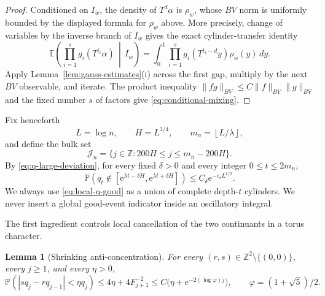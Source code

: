 \documentclass[11pt,a4paper]{amsart}
\newtheorem{lemma}[theorem]{Lemma}
\theoremstyle{definition}
\theoremstyle{remark}
\newcommand{\Z}{\mathbb Z}
\newcommand{\E}{\mathbb E}
\newcommand{\Pp}{\mathbb P}
\newcommand{\e}{\mathrm e}
\begin{document}
\begin{proof}
Conditioned on $I_w$, the density of $T^d\alpha$ is $\rho_w$, whose $BV$
norm is uniformly bounded by the displayed formula for $\rho_w$ above.  More
precisely, change of variables by the inverse branch of $I_w$ gives the exact
cylinder-transfer identity
\[
 \E\left(\prod_{i=1}^s g_i(T^{t_i}\alpha)\,\middle|\,I_w\right)
 =\int_0^1\prod_{i=1}^s g_i(T^{t_i-d}y)\rho_w(y)\,dy.
\]
Apply Lemma~\ref{lem:gauss-estimates}(i) across the first gap, multiply by the
next $BV$ observable, and iterate.  The product inequality
$\|fg\|_{BV}\le C\|f\|_{BV}\|g\|_{BV}$ and the fixed number $s$ of factors
give \eqref{eq:conditional-mixing}.
\end{proof}

Fix henceforth
\begin{equation}\label{eq:scales}
 L=\log n,\qquad H=L^{3/4},\qquad
 m_n=\left\lfloor L/\lambda\right\rfloor,
\end{equation}
and define the bulk set
\begin{equation}\label{eq:bulk}
 \mathcal J_n=\{j\in\Z:200H\le j\le m_n-200H\}.
\end{equation}
By \eqref{eq:q-large-deviation}, for every fixed $\delta>0$ and
every integer $0\le t\le2m_n$,
\begin{equation}\label{eq:local-q-good}
 \Pp(q_t\notin[\e^{\lambda t-\delta H},
                    \e^{\lambda t+\delta H}])
 \le C_\delta \e^{-c_\delta L^{1/2}}.
\end{equation}
We always use \eqref{eq:local-q-good} as a union of complete depth-$t$
cylinders.  We never insert a global good-event indicator inside an
oscillatory integral.

The first ingredient controls local cancellation of the two continuants in a
torus character.

\begin{lemma}[Shrinking anti-concentration]\label{lem:anti}
For every $(r,s)\in\Z^2\setminus\{(0,0)\}$, every $j\ge1$, and every
$\eta>0$,
\begin{equation}\label{eq:anti}
 \Pp(|sq_j-rq_{j-1}|<\eta q_j)
 \le 4\eta+4F_{j+1}^{-2}
 \le C\bigl(\eta+\e^{-2(\log\varphi)j}\bigr),
 \qquad \varphi=(1+\sqrt5)/2.
\end{equation}
\end{lemma}
\end{document}
